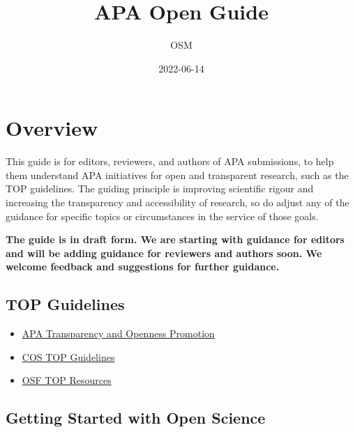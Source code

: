 \documentclass[
  oneside]{book}
\title{APA Open Guide}
\author{OSM}
\date{2022-06-14}
\providecommand{\tightlist}{%
  \setlength{\itemsep}{0pt}\setlength{\parskip}{0pt}}
\begin{document}
\maketitle

{
\setcounter{tocdepth}{1}
\tableofcontents
}
\hypertarget{overview}{%
\chapter*{Overview}\label{overview}}

This guide is for editors, reviewers, and authors of APA submissions, to help them understand APA initiatives for open and transparent research, such as the TOP guidelines. The guiding principle is improving scientific rigour and increasing the transparency and accessibility of research, so do adjust any of the guidance for specific topics or circumstances in the service of those goals.

\textbf{The guide is in draft form. We are starting with guidance for editors and will be adding guidance for reviewers and authors soon. We welcome feedback and suggestions for further guidance.}

\hypertarget{top-guidelines}{%
\section{TOP Guidelines}\label{top-guidelines}}

\begin{itemize}
\tightlist
\item
  \href{https://www.apa.org/pubs/journals/resources/transparency-openness-promotion}{APA Transparency and Openness Promotion}
\item
  \href{https://www.cos.io/initiatives/top-guidelines}{COS TOP Guidelines}
\item
  \href{https://osf.io/9f6gx/}{OSF TOP Resources}
\end{itemize}

\hypertarget{getting-started-with-open-science}{%
\section{Getting Started with Open Science}\label{getting-started-with-open-science}}
\end{document}

